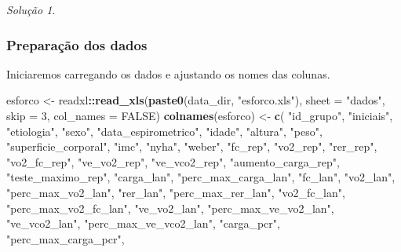 \documentclass[
]{latex/krantz}
\newenvironment{Shaded}{\begin{snugshade}}{\end{snugshade}}
\newcommand{\AttributeTok}[1]{\textcolor[rgb]{0.13,0.29,0.53}{#1}}
\newcommand{\ConstantTok}[1]{\textcolor[rgb]{0.56,0.35,0.01}{#1}}
\newcommand{\DecValTok}[1]{\textcolor[rgb]{0.00,0.00,0.81}{#1}}
\newcommand{\FunctionTok}[1]{\textcolor[rgb]{0.13,0.29,0.53}{\textbf{#1}}}
\newcommand{\NormalTok}[1]{#1}
\newcommand{\OtherTok}[1]{\textcolor[rgb]{0.56,0.35,0.01}{#1}}
\newcommand{\SpecialCharTok}[1]{\textcolor[rgb]{0.81,0.36,0.00}{\textbf{#1}}}
\newcommand{\StringTok}[1]{\textcolor[rgb]{0.31,0.60,0.02}{#1}}
\theoremstyle{definition}
\theoremstyle{definition}
\theoremstyle{definition}
\theoremstyle{definition}
\theoremstyle{remark}
\newtheorem*{solution}{Solução}
\begin{document}
\begin{solution}
\leavevmode

\hypertarget{preparauxe7uxe3o-dos-dados-2}{%
\subsubsection*{Preparação dos dados}\label{preparauxe7uxe3o-dos-dados-2}}

Iniciaremos carregando os dados e ajustando os nomes das colunas.

\begin{Shaded}
\begin{Highlighting}[]
\NormalTok{esforco }\OtherTok{\textless{}{-}}\NormalTok{ readxl}\SpecialCharTok{::}\FunctionTok{read\_xls}\NormalTok{(}\FunctionTok{paste0}\NormalTok{(data\_dir, }\StringTok{"esforco.xls"}\NormalTok{), }\AttributeTok{sheet =} \StringTok{"dados"}\NormalTok{, }\AttributeTok{skip =} \DecValTok{3}\NormalTok{, }\AttributeTok{col\_names =} \ConstantTok{FALSE}\NormalTok{)}
\FunctionTok{colnames}\NormalTok{(esforco) }\OtherTok{\textless{}{-}} \FunctionTok{c}\NormalTok{(}
                        \StringTok{"id\_grupo"}\NormalTok{, }\StringTok{"iniciais"}\NormalTok{, }\StringTok{"etiologia"}\NormalTok{, }\StringTok{"sexo"}\NormalTok{, }\StringTok{"data\_espirometrico"}\NormalTok{,}
                        \StringTok{"idade"}\NormalTok{, }\StringTok{"altura"}\NormalTok{, }\StringTok{"peso"}\NormalTok{, }\StringTok{"superficie\_corporal"}\NormalTok{, }\StringTok{"imc"}\NormalTok{,}
                        \StringTok{"nyha"}\NormalTok{, }\StringTok{"weber"}\NormalTok{, }\StringTok{"fc\_rep"}\NormalTok{, }\StringTok{"vo2\_rep"}\NormalTok{, }\StringTok{"rer\_rep"}\NormalTok{, }\StringTok{"vo2\_fc\_rep"}\NormalTok{,}
                        \StringTok{"ve\_vo2\_rep"}\NormalTok{, }\StringTok{"ve\_vco2\_rep"}\NormalTok{, }\StringTok{"aumento\_carga\_rep"}\NormalTok{, }\StringTok{"teste\_maximo\_rep"}\NormalTok{,}
                        \StringTok{"carga\_lan"}\NormalTok{, }\StringTok{"perc\_max\_carga\_lan"}\NormalTok{, }\StringTok{"fc\_lan"}\NormalTok{, }\StringTok{"vo2\_lan"}\NormalTok{, }
                        \StringTok{"perc\_max\_vo2\_lan"}\NormalTok{, }\StringTok{"rer\_lan"}\NormalTok{, }\StringTok{"perc\_max\_rer\_lan"}\NormalTok{, }\StringTok{"vo2\_fc\_lan"}\NormalTok{,}
                        \StringTok{"perc\_max\_vo2\_fc\_lan"}\NormalTok{, }\StringTok{"ve\_vo2\_lan"}\NormalTok{, }\StringTok{"perc\_max\_ve\_vo2\_lan"}\NormalTok{,}
                        \StringTok{"ve\_vco2\_lan"}\NormalTok{, }\StringTok{"perc\_max\_ve\_vco2\_lan"}\NormalTok{, }\StringTok{"carga\_pcr"}\NormalTok{, }\StringTok{"perc\_max\_carga\_pcr"}\NormalTok{,}

\end{Highlighting}
\end{Shaded}
\end{solution}
\end{document}
